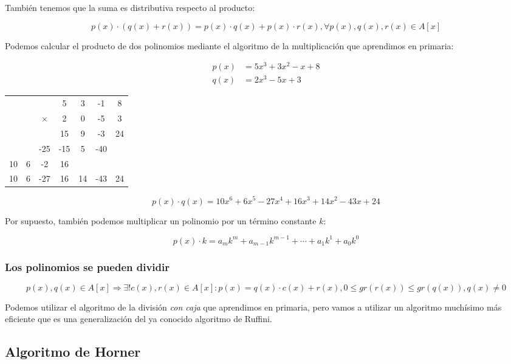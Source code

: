 También tenemos que la suma es distributiva respecto al producto:

\[p(x) \cdot (q(x) + r(x)) = p(x) \cdot q(x) + p(x) \cdot r(x), \forall p(x),q(x),r(x) \in A[x]\]

Podemos calcular el producto de dos polinomios mediante el algoritmo de la multiplicación que aprendimos en primaria:

\[
\begin{array}{ll}
	p(x) & = 5x^3 + 3x^2 - x  + 8 \\
	q(x) & = 2x^3        - 5x + 3
\end{array}
\]

\begin{center}
\setlength{\tabcolsep}{1ex}
\begin{tabular}{c c c c c c c}
	   &   &          & 5   & 3  & -1  & 8  \\
	   &   & $\times$ & 2   & 0  & -5  & 3  \\
	\midrule
	   &   &          & 15  & 9  & -3  & 24 \\
	   &   & -25      & -15 & 5  & -40 &    \\
	10 & 6 & -2       & 16  &    &     &    \\
	\midrule
	10 & 6 & -27      & 16  & 14 & -43 & 24 \\
\end{tabular}
\end{center}

\[p(x) \cdot q(x) = 10x^6 + 6x^5 - 27x^4 + 16x^3 + 14x^2 - 43x + 24\]

Por supuesto, también podemos multiplicar un polinomio por un término constante $k$:

\[p(x) \cdot k = a_{m}k^{m} + a_{m-1}k^{m-1} + \cdots + a_{1}k^{1} + a_{0}k^{0} \]

\subsubsection{Los polinomios se pueden dividir}

\[p(x),q(x) \in A[x] \Rightarrow \exists! c(x),r(x) \in A[x] : p(x) = q(x) \cdot c(x) + r(x), 0 \leq gr(r(x)) \leq gr(q(x)), q(x) \neq 0\]

Podemos utilizar el algoritmo de la división \textit{con caja} que aprendimos en primaria, pero vamos a utilizar un algoritmo muchísimo más eficiente que es una generalización del ya conocido algoritmo de Ruffini.

\subsection{Algoritmo de Horner}

